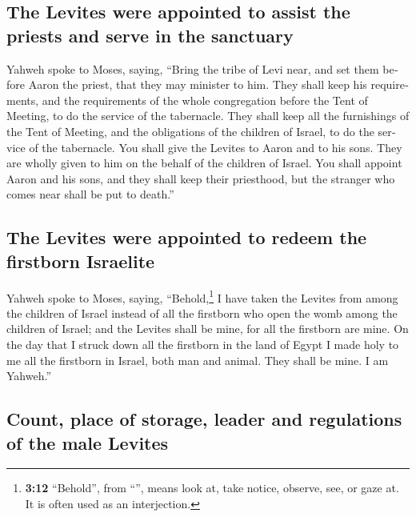 \begin{paracol}{2}
\begin{otherlanguage}{english}
\hypertarget{the-levites-were-appointed-to-assist-the-priests-and-serve-in-the-sanctuary}{%
\subsection{The Levites were appointed to assist the priests and serve
in the
sanctuary}\label{the-levites-were-appointed-to-assist-the-priests-and-serve-in-the-sanctuary}}

 Yahweh spoke to Moses, saying,  ``Bring the
tribe of Levi near, and set them before Aaron the priest, that they may
minister to him.  They shall keep his requirements, and
the requirements of the whole congregation before the Tent of Meeting,
to do the service of the tabernacle.  They shall keep all
the furnishings of the Tent of Meeting, and the obligations of the
children of Israel, to do the service of the tabernacle. 
You shall give the Levites to Aaron and to his sons. They are wholly
given to him on the behalf of the children of Israel. 
You shall appoint Aaron and his sons, and they shall keep their
priesthood, but the stranger who comes near shall be put to death.''

\hypertarget{the-levites-were-appointed-to-redeem-the-firstborn-israelite}{%
\subsection{The Levites were appointed to redeem the firstborn
Israelite}\label{the-levites-were-appointed-to-redeem-the-firstborn-israelite}}

 Yahweh spoke to Moses, saying, 
``Behold,\footnote{\textbf{3:12} ``Behold'', from ``'',
  means look at, take notice, observe, see, or gaze at. It is often used
  as an interjection.} I have taken the Levites from among the children
of Israel instead of all the firstborn who open the womb among the
children of Israel; and the Levites shall be mine,  for
all the firstborn are mine. On the day that I struck down all the
firstborn in the land of Egypt I made holy to me all the firstborn in
Israel, both man and animal. They shall be mine. I am Yahweh.''

\hypertarget{count-place-of-storage-leader-and-regulations-of-the-male-levites}{%
\subsection{Count, place of storage, leader and regulations of the male
Levites}\label{count-place-of-storage-leader-and-regulations-of-the-male-levites}}


\end{otherlanguage}
\end{paracol}
